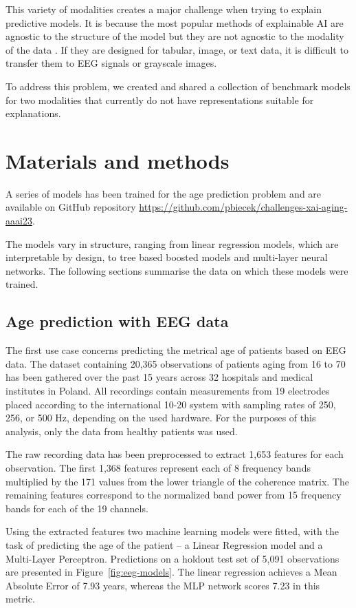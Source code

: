 \documentclass[letterpaper]{article} %
\begin{document}
This variety of modalities creates a major challenge when trying to explain predictive models. It is because the most popular methods of explainable AI are agnostic to the structure of the model but they are not agnostic to the modality of the data \cite{Holzinger2022, ema21}. If they are designed for tabular, image, or text data, it is difficult to transfer them to EEG signals or grayscale images.

To address this problem, we created and shared a collection of benchmark models for two modalities that currently do not have representations suitable for explanations.


\section{Materials and methods}

A series of models has been trained for the age prediction problem and are available on GitHub repository \url{https://github.com/pbiecek/challenges-xai-aging-aaai23}. 

The models vary in structure, ranging from linear regression models, which are  interpretable by design, to tree based boosted models and multi-layer neural networks. The following sections summarise the data on which these models were trained.

\subsection{Age prediction with EEG data}

The first use case concerns predicting the metrical age of patients based on EEG data. The dataset containing 20,365 observations of patients aging from 16 to 70 has been gathered over the past 15 years across 32 hospitals and medical institutes in Poland. All recordings contain measurements from 19 electrodes placed according to the international 10-20 system \cite{system10-20} with sampling rates of 250, 256, or 500 Hz, depending on the used hardware. For the purposes of this analysis, only the data from healthy patients was used.

The raw recording data has been preprocessed to extract 1,653 features for each observation. The first 1,368 features represent each of 8 frequency bands multiplied by the 171 values from the lower triangle of the coherence matrix. The remaining features correspond to the normalized band power from 15 frequency bands for each of the 19 channels. 

Using the extracted features two machine learning models were fitted, with the task of predicting the age of the patient -- a Linear Regression model and a Multi-Layer Perceptron. Predictions on a holdout test set of 5,091 observations are presented in Figure~\ref{fig:eeg-models}. The linear regression achieves a Mean Absolute Error of 7.93 years, whereas the MLP network scores 7.23 in this metric. %
\end{document}
